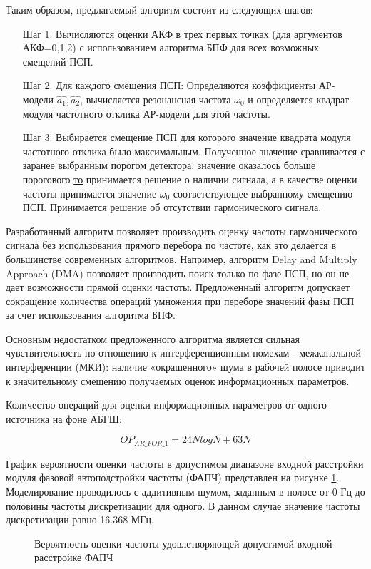 Таким образом, предлагаемый алгоритм состоит из следующих шагов:

\begin{itemize}
\item[Шаг 1.] Вычисляются оценки  АКФ в трех первых точках (для аргументов АКФ=0,1,2)
	с использованием алгоритма БПФ для всех возможных смещений ПСП. 
\item[Шаг 2.] Для каждого смещения ПСП: 
	Определяются коэффициенты АР-модели ${\hat{a_1}, \hat{a_2}}$,
	вычисляется резонансная частота ${\omega_0}$
	и определяется квадрат модуля частотного отклика АР-модели для этой частоты. 
\item[Шаг 3.] Выбирается смещение ПСП для которого значение квадрата модуля частотного отклика было максимальным. Полученное значение сравнивается с заранее выбранным порогом детектора. 
	  значение оказалось больше порогового {\underline{то}} 
		принимается решение о наличии сигнала, а в качестве оценки
		частоты принимается значение ${\omega_0}$ соответствующее выбранному смещению ПСП. 
		Принимается решение об отсутствии гармонического сигнала.
\end{itemize}

Разработанный алгоритм позволяет производить оценку частоты гармонического сигнала без использования прямого перебора по частоте, как это делается в большинстве современных алгоритмов.
Например, алгоритм Delay and Multiply Approach (DMA) позволяет производить поиск только по фазе ПСП, но он не дает возможности прямой оценки частоты. 
Предложенный алгоритм допускает сокращение количества операций умножения при переборе значений фазы ПСП за счет использования алгоритма БПФ.

Основным недостатком предложенного алгоритма является сильная чувствительность по отношению к интерференционным помехам - межканальной интерференции (МКИ):
наличие «окрашенного» шума в рабочей полосе приводит к значительному смещению получаемых оценок информационных параметров.

Количество операций для оценки информационных параметров от одного источника на фоне АБГШ:
\begin{center}
\begin{equation}
	OP_{AR\_FOR\_1} = 24NlogN + 63N
\end{equation}
\end{center}

График вероятности оценки частоты в допустимом диапазоне входной расстройки модуля фазовой автоподстройки частоты (ФАПЧ) представлен на рисунке
\ref{pic:lpc_for_1_probability}. Моделирование проводилось с аддитивным шумом, заданным в полосе от 0 Гц до
половины частоты дискретизации для одного. В данном случае значение частоты дискретизации равно 16.368 МГц.
\begin{figure}[H]
\center{}
	\caption{Вероятность оценки частоты удовлетворяющей допустимой входной расстройке ФАПЧ}
	\label{pic:lpc_for_1_probability}
\end{figure}

